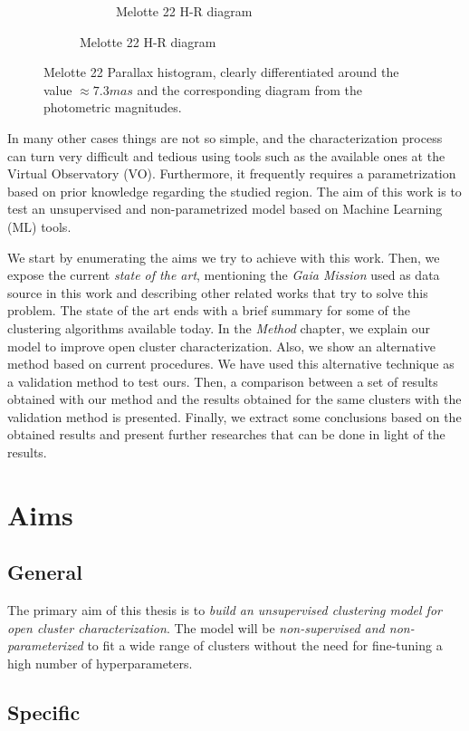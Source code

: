 \documentclass[11pt, a4paper, english]{book}
\begin{document}
\begin{figure}[htbp]
\begin{subfigure}{0.9\textwidth}
\begin{subfigure}[t]{0.45\textwidth}
      \caption{Melotte 22 H-R diagram}
    \end{subfigure}
  \end{subfigure}
  \caption{Melotte 22 Parallax histogram, clearly differentiated around the value $\approx 7.3mas$
           and the corresponding diagram from the photometric magnitudes.}
  \label{fig:melotte_22_pm_parallax}
\end{figure}

In many other cases things are not so simple,
and the characterization process can turn very difficult and tedious using tools such as the available ones at the Virtual Observatory (VO).
Furthermore, it frequently requires a parametrization based on prior knowledge regarding the studied region.
The aim of this work is to test an unsupervised and non-parametrized model based on Machine Learning (ML) tools.

We start by enumerating the aims we try to achieve with this work.
Then, we expose the current \emph{state of the art}, mentioning the \emph{Gaia Mission} used as data source in this work and
describing other related works that try to solve this problem.
The state of the art ends with a brief summary for some of the clustering algorithms available today.
In the \emph{Method} chapter, we explain our model to improve open cluster characterization.
Also, we show an alternative method based on current procedures.
We have used this alternative technique as a validation method to test ours.
Then, a comparison between a set of results obtained with our method and the results obtained
for the same clusters with the validation method is presented.
Finally, we extract some conclusions based on the obtained results and present
further researches that can be done in light of the results.

\chapter{Aims}

\section{General}

The primary aim of this thesis is to \emph{build an unsupervised clustering model for open cluster characterization}.
The model will be \emph{non-supervised and non-parameterized} to fit a wide range of clusters without
the need for fine-tuning a high number of hyperparameters.

\section{Specific}
\end{document}
